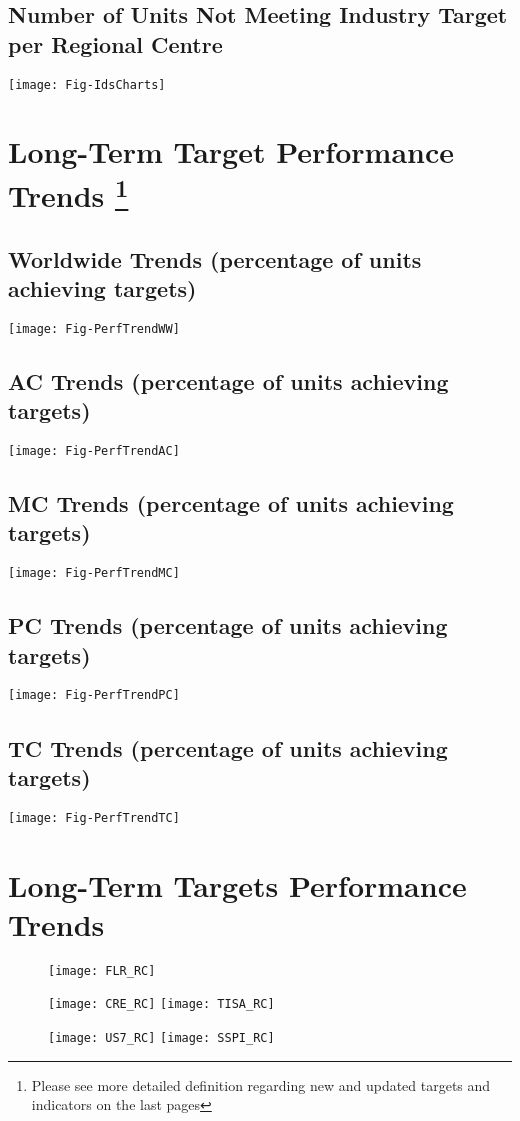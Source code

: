 \documentclass{article}
\begin{document}
\subsection*{Number of Units Not Meeting Industry Target per Regional Centre}

\texttt{[image: Fig-IdsCharts]}


\section*{Long-Term Target Performance Trends \footnote{Please see more detailed definition regarding new and updated targets and indicators on the last pages}}
\subsection*{Worldwide Trends (percentage of units achieving targets)}

\texttt{[image: Fig-PerfTrendWW]}

\subsection*{AC Trends (percentage of units achieving targets)}
\texttt{[image: Fig-PerfTrendAC]}

\subsection*{MC Trends (percentage of units achieving targets)}
\texttt{[image: Fig-PerfTrendMC]}

\subsection*{PC Trends (percentage of units achieving targets)}
\texttt{[image: Fig-PerfTrendPC]}

\subsection*{TC Trends (percentage of units achieving targets)}
\texttt{[image: Fig-PerfTrendTC]}

\section*{Long-Term Targets Performance Trends}


\begin{figure}[h]
\centering
\texttt{[image: FLR\_RC]}
\end{figure}
\begin{figure}[p]
\centering
\texttt{[image: CRE\_RC]}
\texttt{[image: TISA\_RC]}
\end{figure}
\begin{figure}[p]
\centering
\texttt{[image: US7\_RC]}
\texttt{[image: SSPI\_RC]}
\end{figure}
\end{document}

